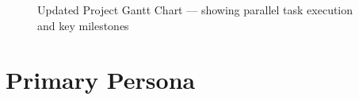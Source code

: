 \documentclass[11pt, letterpaper]{article}
\begin{document}
\begin{figure}[H]
{\begin{ganttchart}
\end{ganttchart}
}
\caption{Updated Project Gantt Chart --- showing parallel task execution and key milestones}
\end{figure}

\newpage
\section{Primary Persona}

\end{document}
